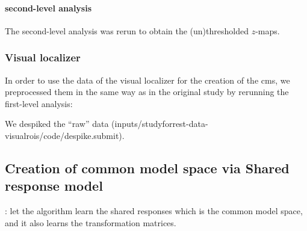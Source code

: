 {\paragraph{second-level analysis}


The second-level analysis was rerun to obtain the (un)thresholded $z$-maps.


\subsubsection{Visual localizer}
In order to use the data of the visual localizer for the creation of the
\ac{cms}, we preprocessed them in the same way as in the original study
\citep{sengupta2016extension} by rerunning the first-level analysis:

We despiked the ``raw'' data
(inputs/studyforrest-data-visualrois/code/despike.submit).


\subsection{Creation of common model space via Shared response model}

\citep{chen2015reduced}: let the algorithm learn the shared responses which is
the common model space, and it also learns the transformation matrices.
%



}
